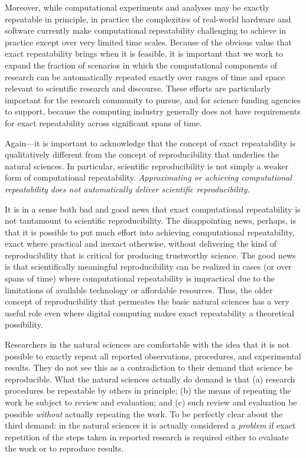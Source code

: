 Moreover, while computational experiments and analyses may be exactly repeatable in principle, 
	in practice the complexities of real-world hardware and software currently make computational repeatability 
	challenging to achieve in practice except over very limited time scales.
Because of the obvious value that exact repeatability brings when it is feasible, it is important that we work to
	expand the fraction of scenarios in which the computational components of research can be automatically 
	repeated exactly over ranges of time and space relevant to scientific research and discourse.
These efforts are particularly important for the research community to pursue, and for science funding
	agencies to support, because the computing industry generally does not have requirements for exact 
	repeatability across significant spans of time.

Again---it is important to acknowledge that the concept of exact repeatability is 
	qualitatively different from the concept of reproducibility that underlies the natural sciences.
In particular, scientific reproducibility is not simply a weaker form of computational repeatability.  
\emph{Approximating or achieving computational repeatability does not automatically deliver scientific reproducibility.}

It is in a sense both bad and good news that exact computational repeatability is not tantamount to scientific reproducibility.
The disappointing news, perhaps, is that it is possible to put much effort into achieving computational repeatability,
	exact where practical and inexact otherwise,
	without delivering the kind of reproducibility that is critical for producing trustworthy science.
The good news is that scientifically meaningful reproducibility can be realized in cases (or over spans of time)
	where computational repeatability is impractical due to the limitations of available technology or affordable resources.
Thus, the older concept of reproducibility that permeates the basic natural sciences has a very
	useful role even where digital computing makes exact repeatability a theoretical possibility.

 Researchers in the natural sciences are comfortable with the idea that it is not possible to exactly
	repeat all reported observations, procedures, and experimental results.
They do not see this as a contradiction to their demand that science be reproducible.
What the natural sciences actually do demand is that 
	(a) research procedures be repeatable by others in principle;
	(b) the means of repeating the work be subject to review and evaluation; 
	and (c) such review and evaluation be possible \emph{without} actually repeating the work.
To be perfectly clear about the third demand: in the natural sciences it is actually considered a 
	\emph{problem} if exact repetition of the steps taken in reported research is required either
	to evaluate the work or to reproduce results.

